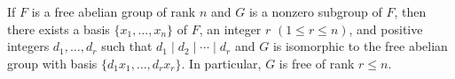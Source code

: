 If $F$ is a free abelian group of rank $n$ and $G$ is a nonzero subgroup of $F$, then there exists a basis $\{x_1, \ldots, x_n\}$ of $F$, an integer $r$ $(1 \leq r \leq n)$, and positive integers $d_1, \ldots, d_r$ such that $d_1 \mid d_2 \mid \cdots \mid d_r$ and $G$ is isomorphic to the free abelian group with basis $\{d_1x_1, \ldots, d_rx_r\}$. In particular, $G$ is free of rank $r \leq n$.

